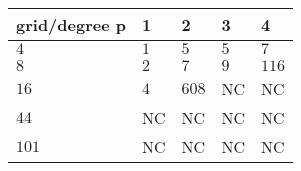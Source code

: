\begin{tabular}{lllll}
\hline
 grid/degree p   & 1   & 2     & 3   & 4     \\
\hline
 $4$             & $1$ & $5$   & $5$ & $7$   \\
 $8$             & $2$ & $7$   & $9$ & $116$ \\
 $16$            & $4$ & $608$ & NC  & NC    \\
 $44$            & NC  & NC    & NC  & NC    \\
 $101$           & NC  & NC    & NC  & NC    \\
\hline
\end{tabular}